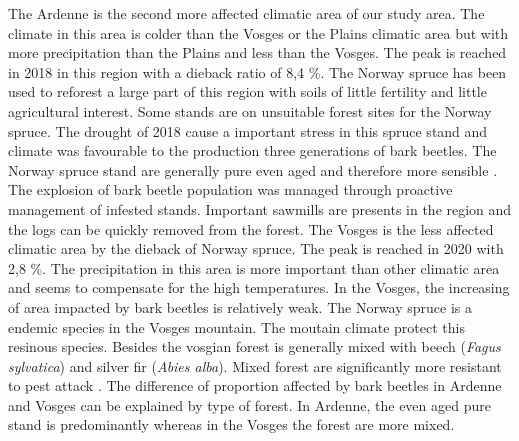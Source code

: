 \documentclass[3p,procedia]{elsarticle}
\begin{document}
The Ardenne is the second more affected climatic area of our study area. 
The climate in this area is colder than the Vosges or the Plains climatic area but with more precipitation than the Plains and less than the Vosges.
The peak is reached in 2018 in this region with a dieback ratio of 8,4 \%. 
The Norway spruce has been used to reforest a large part of this region with soils of little fertility and little agricultural interest. 
Some stands are on unsuitable forest sites for the Norway spruce. 
The drought of 2018 cause a important stress in this spruce stand and climate was favourable to the production three generations of bark beetles.
The Norway spruce stand are generally pure even aged and therefore more sensible \citep{jactel_2021}.
The explosion of bark beetle population was managed through proactive management of infested stands.
Important sawmills are presents in the region and the logs can be quickly removed from the forest.
The Vosges is the less affected climatic area by the dieback of Norway spruce.
The peak is reached in 2020 with 2,8 \%.
The precipitation in this area is more important than other climatic area and seems to compensate for the high temperatures.
In the Vosges, the increasing of area impacted by bark beetles is relatively weak.
The Norway spruce is a endemic species in the Vosges mountain. 
The moutain climate protect this resinous species. 
Besides the vosgian forest is generally mixed with beech (\textit{Fagus sylvatica}) and  silver fir (\textit{Abies alba}).
Mixed forest are significantly more resistant to pest attack \citep{jactel_2021}. 
The difference of proportion affected by bark beetles in Ardenne and Vosges can be explained by type of forest.
In Ardenne, the even aged pure stand is predominantly whereas in the Vosges  the forest are more mixed. 
\fi







	
\end{document}
